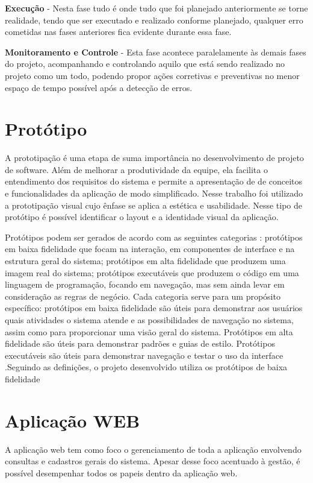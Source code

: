 {\textbf{Execução} - Nesta fase tudo é onde tudo que foi planejado anteriormente se torne realidade, tendo que ser executado e realizado conforme planejado, qualquer erro cometidas nas fases anteriores fica evidente durante essa fase. }

{\textbf{Monitoramento e Controle} - Esta fase acontece paralelamente às demais fases do projeto, acompanhando e controlando aquilo que está sendo realizado no projeto como um todo, podendo propor ações corretivas e preventivas no menor espaço de tempo possível após a detecção de erros.}


\section{Protótipo}

A prototipação é uma etapa de suma importância no desenvolvimento de projeto de software. Além de melhorar a produtividade da equipe, ela facilita o entendimento dos requisitos do sistema e permite a apresentação de de conceitos e funcionalidades da aplicação de modo simplificado.
Nesse trabalho foi utilizado a prototipação visual cujo ênfase se aplica a estética e usabilidade. Nesse tipo de protótipo é possível identificar o layout e a identidade visual da aplicação. \cite{dextra2013prototipacao}

{Protótipos podem ser gerados de acordo com as seguintes categorias \cite{coyette2004sketchixml}: protótipos em baixa fidelidade que focam na interação, em componentes de interface e na estrutura geral do sistema; protótipos em alta fidelidade que produzem uma imagem real do sistema; protótipos executáveis que produzem o código em uma linguagem de programação, focando em navegação, mas sem ainda levar em consideração as regras de negócio. Cada categoria serve para um propósito específico: protótipos em baixa fidelidade são úteis para demonstrar aos usuários quais atividades o sistema atende e as possibilidades de navegação no sistema, assim como para proporcionar uma visão geral do sistema. Protótipos em alta fidelidade são úteis para demonstrar padrões e guias de estilo. Protótipos executáveis são úteis para demonstrar navegação e testar o uso da interface \cite{rosemberg2008prototipaccao}.Seguindo as definições, o projeto desenvolvido utiliza os protótipos de baixa fidelidade}

\section{Aplicação WEB}
A aplicação web tem como foco o gerenciamento de toda a aplicação envolvendo consultas e cadastros gerais do sistema.
Apesar desse foco acentuado à gestão, é possível desempenhar todos os papeis dentro da aplicação web.

